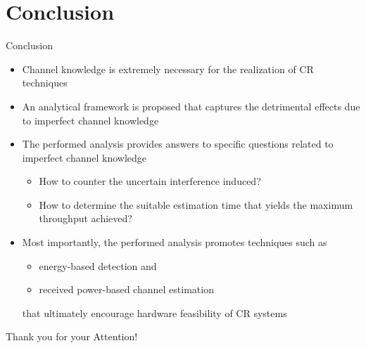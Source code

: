 \documentclass[16pt]{beamer}
\newcommand{\fs}[2]{\fontsize{#1 pt}{#2}\selectfont}
\begin{document}
\section{Conclusion}
\begin{frame}[c]{Conclusion}
	\fs{8}{9}
		\begin{itemize}	
			\item Channel knowledge is extremely necessary for the realization of CR techniques %
			\item An analytical framework is proposed that captures the detrimental effects due to imperfect channel knowledge  
			\item The performed analysis provides answers to specific questions related to imperfect channel knowledge 
				\begin{itemize} 
				\fs{8}{9}
\item How to counter the uncertain interference induced? %
\item How to determine the suitable estimation time that yields the maximum throughput achieved? \end{itemize}
\item Most importantly, the performed analysis promotes techniques such as 

\begin{itemize} 
\fs{8}{9}
\item energy-based detection and \item received power-based channel estimation \end{itemize} that ultimately encourage hardware feasibility of CR systems
		\end{itemize} 
\end{frame}

\begin{frame}[c]{}
\begin{center}
Thank you for your Attention!
\end{center}
\end{frame}
\end{document}
